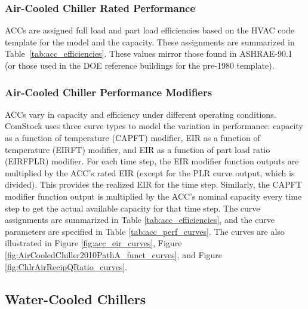 
\subsubsection{Air-Cooled Chiller Rated Performance}

ACCs are assigned full load and part load efficiencies based on the HVAC code template for the model and the capacity. These assignments are summarized in Table~\ref{tab:acc_efficiencies}. These values mirror those found in ASHRAE-90.1 (or those used in the DOE reference buildings for the pre-1980 template).



\subsubsection{Air-Cooled Chiller Performance Modifiers}

ACCs vary in capacity and efficiency under different operating conditions. ComStock uses three curve types to model the variation in performance: capacity as a function of temperature (CAPFT) modifier, EIR as a function of temperature (EIRFT) modifier, and EIR as a function of part load ratio (EIRFPLR) modifier. For each time step, the EIR modifier function outputs are multiplied by the ACC's rated EIR (except for the PLR curve output, which is divided). This provides the realized EIR for the time step. Similarly, the CAPFT modifier function output is multiplied by the ACC's nominal capacity every time step to get the actual available capacity for that time step. The curve assignments are summarized in Table \ref{tab:acc_efficiencies}, and the curve parameters are specified in Table \ref{tab:acc_perf_curves}. The curves are also illustrated in Figure \ref{fig:acc_eir_curves}, Figure \ref{fig:AirCooledChiller2010PathA_funct_curves}, and Figure \ref{fig:ChlrAirRecipQRatio_curves}.


\subsection{Water-Cooled Chillers}

